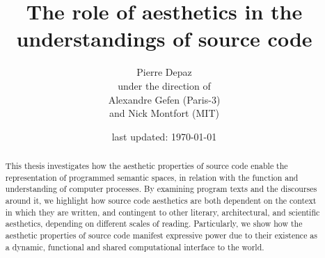 \documentclass{report}
\begin{document}
\title{The role of aesthetics in the understandings of source code}
\author{Pierre Depaz\\under the direction of\\Alexandre Gefen (Paris-3)\\and Nick Montfort (MIT)}
\date{last updated: \today}
\maketitle

\begin{abstract}
    This thesis investigates how the aesthetic properties of source code enable the representation of programmed semantic spaces, in relation with the function and understanding of computer processes. By examining program texts and the discourses around it, we highlight how source code aesthetics are both dependent on the context in which they are written, and contingent to other literary, architectural, and scientific aesthetics, depending on different scales of reading. Particularly, we show how the aesthetic properties of source code manifest expressive power due to their existence as a dynamic, functional and shared computational interface to the world.
\end{abstract}




\pagebreak



\pagebreak



\pagebreak



\pagebreak



\pagebreak






\end{document}

